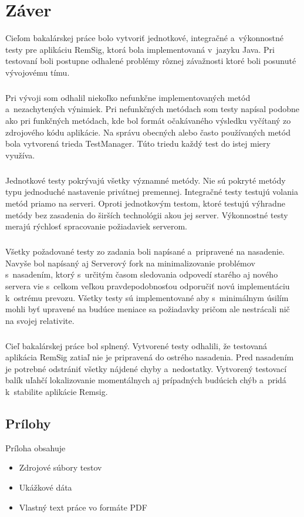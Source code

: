 \documentclass[
  digital, %
  table,   %
oneside,
  nolof,     %
  nolot,     %
]{fithesis3}
\begin{document}
\chapter{Záver}
Cieľom bakalárskej práce bolo vytvoriť jednotkové, integračné a~výkonnostné testy pre aplikáciu RemSig, ktorá bola implementovaná v~jazyku Java. Pri testovaní boli postupne odhalené problémy rôznej závažnosti ktoré boli posunuté vývojovému tímu. \paragraph{}
Pri vývoji som odhalil niekoľko nefunkčne implementovaných metód a~nezachytených výnimiek. Pri nefunkčných metódach som testy napísal podobne ako pri funkčných metódach, kde bol formát očakávaného výsledku vyčítaný zo zdrojového kódu aplikácie. Na správu obecných alebo často používaných metód bola vytvorená trieda TestManager. Túto triedu každý test do istej miery využíva. \paragraph{}
Jednotkové testy pokrývajú všetky významné metódy. Nie sú pokryté metódy typu jednoduché nastavenie privátnej premennej. Integračné testy testujú volania metód priamo na serveri. Oproti jednotkovým testom, ktoré testujú výhradne metódy bez zasadenia do širších technológii akou jej server. Výkonnostné testy merajú rýchlosť spracovanie požiadaviek serverom.\paragraph{}
Všetky požadované testy zo zadania boli napísané a~pripravené na nasadenie. Navyše bol napísaný aj Serverový fork na minimalizovanie problémov s~nasadením, ktorý s~určitým časom sledovania odpovedí starého aj nového servera vie s~celkom veľkou pravdepodobnosťou odporučiť novú implementáciu k~ostrému prevozu. Všetky testy sú  implementované aby s~minimálnym úsilím mohli byť upravené na budúce meniace sa požiadavky pričom ale nestrácali nič na svojej relativite.\paragraph{}
Cieľ bakalárskej práce bol splnený. Vytvorené testy odhalili, že testovaná aplikácia RemSig zatiaľ nie je pripravená do ostrého nasadenia. Pred nasadením je potrebné odstrániť všetky nájdené chyby a~nedostatky. Vytvorený testovací balík uľahčí lokalizovanie momentálnych aj prípadných budúcich chýb a~pridá k~stabilite aplikácie Remsig.

\printbibliography

  

\begin{appendix}


\chapter{Prílohy}
Príloha obsahuje
\begin{itemize}
	\item Zdrojové súbory testov
	\item Ukážkové dáta 
	\item Vlastný text práce vo formáte PDF
\end{itemize}



\end{appendix}
\end{document}
